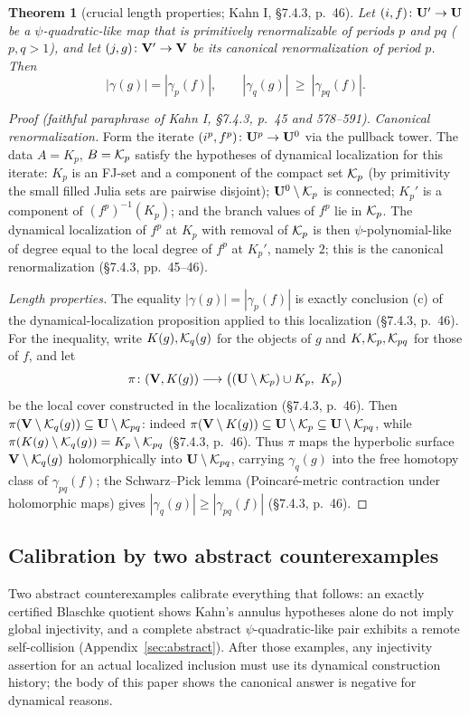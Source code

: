 \documentclass[11pt,reqno]{amsart}
\newtheorem{theorem}{Theorem}[section]
\theoremstyle{definition}
\theoremstyle{remark}
\begin{document}
\begin{theorem}[crucial length properties; Kahn I, \S7.4.3, p.~46]\label{thm:kahn-iterated-lengths}
Let \((i,f)\colon\mathbf{U}'\to\mathbf{U}\) be a \(\psi\)-quadratic-like map that is
primitively renormalizable of periods \(p\) and \(pq\) (\(p,q>1\)),
and let \((j,g)\colon\mathbf{V}'\to\mathbf{V}\) be its canonical renormalization of
period \(p\).  Then
\[
 |\gamma(g)|=|\gamma_p(f)|,
 \qquad
 |\gamma_q(g)|\ \ge\ |\gamma_{pq}(f)| .
\]
\end{theorem}

\begin{proof}[Proof (faithful paraphrase of Kahn I, \S7.4.3, p.~45 and 578--591)]
\emph{Canonical renormalization.}  Form the iterate
\((i^p,f^p)\colon\mathbf{U}^p\to\mathbf{U}^0\) via the pullback tower.  The data
\(A=K_p\), \(B=\mathcal{K}_p\) satisfy the hypotheses of dynamical
localization for this iterate: \(K_p\) is an FJ-set and a component of
the compact set \(\mathcal{K}_p\) (by primitivity the small filled Julia sets
are pairwise disjoint); \(\mathbf{U}^0\setminus\mathcal{K}_p\) is connected; \(K_p'\) is a
component of \((f^p)^{-1}(K_p)\); and the branch values of \(f^p\) lie
in \(\mathcal{K}_p\).  The dynamical localization of \(f^p\) at \(K_p\) with
removal of \(\mathcal{K}_p\) is then \(\psi\)-polynomial-like of degree equal
to the local degree of \(f^p\) at \(K_p'\), namely \(2\); this is the
canonical renormalization (\S7.4.3, pp.~45--46).

\emph{Length properties.}  The equality \(|\gamma(g)|=|\gamma_p(f)|\)
is exactly conclusion (c) of the dynamical-localization proposition
applied to this localization (\S7.4.3, p.~46).  For the inequality, write
\(K(g),\mathcal{K}_q(g)\) for the objects of \(g\) and
\(K,\mathcal{K}_p,\mathcal{K}_{pq}\) for those of \(f\), and let
\[
 \pi\colon(\mathbf{V},K(g))\longrightarrow\bigl((\mathbf{U}\setminus\mathcal{K}_p)\cup K_p,\ K_p\bigr)
\]
be the local cover constructed in the localization (\S7.4.3, p.~46).
Then \(\pi(\mathbf{V}\setminus\mathcal{K}_q(g))\subseteq\mathbf{U}\setminus\mathcal{K}_{pq}\): indeed
\(\pi(\mathbf{V}\setminus K(g))\subseteq\mathbf{U}\setminus\mathcal{K}_p\subseteq\mathbf{U}\setminus\mathcal{K}_{pq}\),
while \(\pi(K(g)\setminus\mathcal{K}_q(g))=K_p\setminus\mathcal{K}_{pq}\) (\S7.4.3, p.~46).  Thus
\(\pi\) maps the hyperbolic surface \(\mathbf{V}\setminus\mathcal{K}_q(g)\)
holomorphically into \(\mathbf{U}\setminus\mathcal{K}_{pq}\), carrying \(\gamma_q(g)\) into
the free homotopy class of \(\gamma_{pq}(f)\); the Schwarz--Pick lemma
(Poincar\'e-metric contraction under holomorphic maps) gives
\(|\gamma_q(g)|\ge|\gamma_{pq}(f)|\) (\S7.4.3, p.~46).
\end{proof}

\subsection*{Calibration by two abstract counterexamples}
Two abstract counterexamples calibrate everything that follows: an
exactly certified Blaschke quotient shows Kahn's annulus hypotheses
alone do not imply global injectivity, and a complete abstract
$\psi$-quadratic-like pair exhibits a remote self-collision
(Appendix~\ref{sec:abstract}).  After those examples, any injectivity
assertion for an actual localized inclusion must use its dynamical
construction history; the body of this paper shows the canonical
answer is negative for dynamical reasons.
\end{document}
